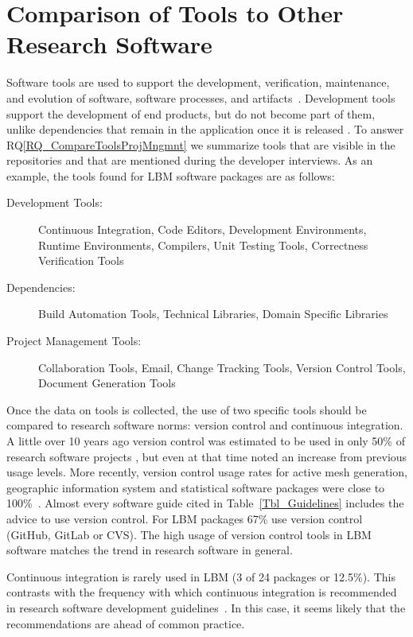 \documentclass[runningheads]{llncs}
\newcommand{\rqref}[1]{RQ\ref{#1}}
\begin{document}
\section{Comparison of Tools to Other Research Software}
\label{Sec_CompareTools}

Software tools are used to support the development, verification, maintenance,
and evolution of software, software processes, and artifacts~\cite[p.\
501]{GhezziEtAl2003}. Development tools support the development of end products,
but do not become part of them, unlike dependencies that remain in the
application once it is released \cite[p.\ 506]{GhezziEtAl2003}. To answer
\rqref{RQ_CompareToolsProjMngmnt} we summarize tools that are visible in the
repositories and that are mentioned during the developer interviews.  As an
example, the tools found for LBM software packages are as follows:

\begin{description}
	\item[Development Tools:] Continuous Integration, Code Editors, Development
	Environments, Runtime Environments, Compilers, Unit Testing Tools,
	Correctness Verification Tools
	\item[Dependencies:] Build Automation Tools, Technical Libraries, Domain
	Specific Libraries
	\item[Project Management Tools:] Collaboration Tools, Email, Change Tracking
	Tools, Version Control Tools, Document Generation Tools
\end{description}

Once the data on tools is collected, the use of two specific tools should be
compared to research software norms: version control and continuous integration.
A little over 10 years ago version control was estimated to be used in only 50\%
of research software projects \cite{Nguyen-HoanEtAl2010}, but even at that time
\cite{Nguyen-HoanEtAl2010} noted an increase from previous usage levels. More
recently, version control usage rates for active mesh generation, geographic
information system and statistical software packages were close to
100\%~\cite{Smith2018}.  Almost every software guide cited in
Table~\ref{Tbl_Guidelines} includes the advice to use version control. For LBM
packages 67\% use version control (GitHub, GitLab or CVS). The high usage of
version control tools in LBM software matches the trend in research software in
general.

Continuous integration is rarely used in LBM (3 of 24 packages or 12.5\%). This
contrasts with the frequency with which continuous integration is recommended in
research software development
guidelines~\cite{BrettEtAl2021,vanGompelEtAl2016,ThielEtAl2020}. In this case,
it seems likely that the recommendations are ahead of common practice.
\end{document}

